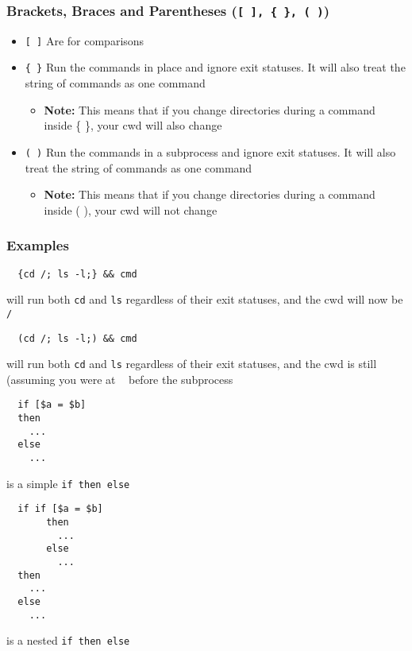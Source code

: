 \documentclass[13pt]{article}
\begin{document}
\subsubsection{Brackets, Braces and Parentheses (\texttt{[ ], \{ \}, ( )})}
\begin{itemize}[leftmargin = 0pt]
\item [] \texttt{[ ]} Are for comparisons
\item [] \texttt{\{ \}} Run the commands in place and ignore exit statuses. It will also treat the string of commands as one command
  \begin{itemize}[leftmargin = 0pt]
  \item [] \textbf{Note:} This means that if you change directories during a command inside \{ \}, your cwd will also change
  \end{itemize}
\item [] \texttt{( )} Run the commands in a subprocess and ignore exit statuses. It will also treat the string of commands as one command
  \begin{itemize}[leftmargin = 0pt]
  \item [] \textbf{Note:} This means that if you change directories during a command inside ( ), your cwd will not change
  \end{itemize}
\end{itemize}

\subsubsection*{Examples}
\begin{verbatim}
  {cd /; ls -l;} && cmd \end{verbatim}
will run both \texttt{cd} and \texttt{ls} regardless of their exit statuses, and the cwd will now be \texttt{/}
\begin{verbatim}
  (cd /; ls -l;) && cmd \end{verbatim}
will run both \texttt{cd} and \texttt{ls} regardless of their exit statuses, and the cwd is still \texttt{~} (assuming you were at \texttt{~} before the subprocess
\begin{verbatim}
  if [$a = $b]
  then
    ...
  else
    ... \end{verbatim}
  is a simple \texttt{if then else}
\begin{verbatim}
  if if [$a = $b]
       then
         ...
       else
         ... 
  then
    ...
  else
    ... \end{verbatim}
  is a nested \texttt{if then else}
  
\end{document}
